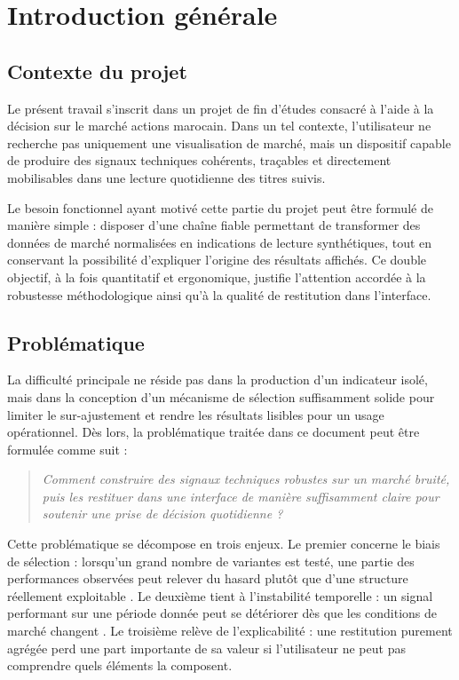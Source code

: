 ﻿\chapter{Introduction générale}

\section{Contexte du projet}
Le présent travail s'inscrit dans un projet de fin d'études consacré à l'aide à
la décision sur le marché actions marocain. Dans un tel contexte, l'utilisateur
ne recherche pas uniquement une visualisation de marché, mais un dispositif
capable de produire des signaux techniques cohérents, traçables et directement
mobilisables dans une lecture quotidienne des titres suivis.

Le besoin fonctionnel ayant motivé cette partie du projet peut être formulé de
manière simple : disposer d'une chaîne fiable permettant de transformer des
données de marché normalisées en indications de lecture synthétiques, tout en
conservant la possibilité d'expliquer l'origine des résultats affichés. Ce
double objectif, à la fois quantitatif et ergonomique, justifie l'attention
accordée à la robustesse méthodologique ainsi qu'à la qualité de restitution
dans l'interface.

\section{Problématique}
La difficulté principale ne réside pas dans la production d'un indicateur
isolé, mais dans la conception d'un mécanisme de sélection suffisamment solide
pour limiter le sur-ajustement et rendre les résultats lisibles pour un usage
opérationnel. Dès lors, la problématique traitée dans ce document peut être
formulée comme suit :

\begin{quote}
\textit{Comment construire des signaux techniques robustes sur un marché bruité,
puis les restituer dans une interface de manière suffisamment claire pour
soutenir une prise de décision quotidienne ?}
\end{quote}

Cette problématique se décompose en trois enjeux. Le premier concerne le biais
de sélection : lorsqu'un grand nombre de variantes est testé, une partie des
performances observées peut relever du hasard plutôt que d'une structure
réellement exploitable \cite{deprado2018,bailey2014}. Le deuxième tient à
l'instabilité temporelle : un signal performant sur une période donnée peut se
détériorer dès que les conditions de marché changent \cite{pardo2008}. Le
troisième relève de l'explicabilité : une restitution purement agrégée perd une
part importante de sa valeur si l'utilisateur ne peut pas comprendre quels
éléments la composent.

